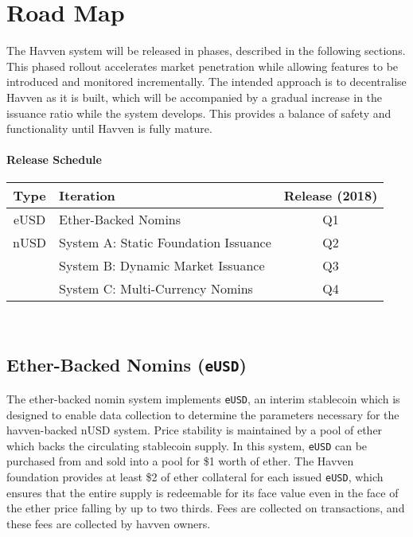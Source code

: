 \section{Road Map}

The Havven system will be released in phases, described in the following
sections. This phased rollout accelerates market penetration while
allowing features to be introduced and monitored incrementally. The intended approach  
is to decentralise Havven as it is built, which will be accompanied by a gradual
increase in the issuance ratio while the system develops.
This provides a balance of safety and functionality until Havven is fully
mature.

\paragraph{Release Schedule}
\renewcommand{\arraystretch}{1.5}
\setlength{\tabcolsep}{13pt}
\begin{centering}
    \begin{tabular}{|c|l|c|}
        \hline
        \textbf{Type} & \textbf{Iteration} & \textbf{Release (2018)} \\
        \hline
        \hline
        eUSD & Ether-Backed Nomins & Q1 \\
        \hline
        \hline
        nUSD & System A: Static Foundation Issuance & Q2 \\ \cline{2-3}
        & System B: Dynamic Market Issuance & Q3 \\ \cline{2-3}
        & System C: Multi-Currency Nomins& Q4 \\
        \hline
    \end{tabular} \\
\end{centering}
\vspace{0.5cm}

\subsection{Ether-Backed Nomins (\texttt{eUSD})}

\noindent The ether-backed nomin system implements \texttt{eUSD}, an interim stablecoin
which is designed to enable data collection to determine the parameters necessary for
the havven-backed nUSD system.
Price stability is maintained by a pool of ether which backs the circulating stablecoin
supply. In this system, \texttt{eUSD} can be purchased from and sold into a pool
for \$1 worth of ether. The Havven foundation provides at least \$2 of ether collateral
for each issued \texttt{eUSD}, which ensures that the entire supply is redeemable for its
face value even in the face of the ether price falling by up to two thirds. Fees are
collected on transactions, and these fees are collected by havven owners. \\


